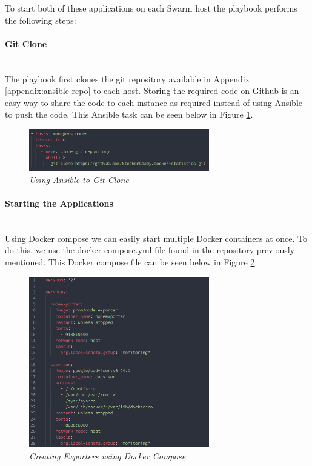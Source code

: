 To start both of these applications on each Swarm host the playbook performs the following steps:

\paragraph{Git Clone}\mbox{}\\
The playbook first clones the git repository available in Appendix \ref{appendix:ansible-repo} to each host. Storing the required code on Github is an easy way to share the code to each instance as required instead of using Ansible to push the code. This Ansible task can be seen below in Figure \ref{fig:git-clone}.

\begin{figure}[!h]
\centering
\includegraphics*[width=0.7\textwidth]{components/images/git-clone}
\caption{\em Using Ansible to Git Clone}
\label{fig:git-clone}
\end{figure}

\paragraph{Starting the Applications}\mbox{}\\
Using Docker compose we can easily start multiple Docker containers at once. To do this, we use the docker-compose.yml file found in the repository previously mentioned. This Docker compose file can be seen below in Figure \ref{fig:exporters-compose}.

\begin{figure}[!h]
\centering
\includegraphics*[width=0.7\textwidth]{components/images/exporters-compose}
\caption{\em Creating Exporters using Docker Compose}
\label{fig:exporters-compose}
\end{figure}

